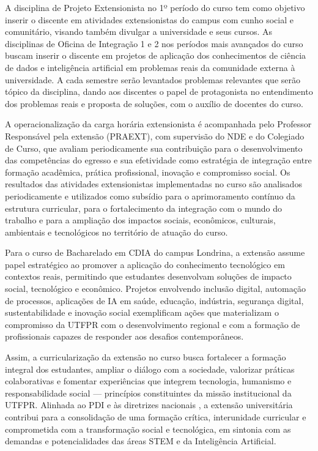 A disciplina de Projeto Extensionista no 1º período do curso tem como objetivo inserir o discente em atividades extensionistas do campus com cunho social e comunitário, visando também divulgar a universidade e seus cursos. As disciplinas de Oficina de Integração 1 e 2 nos períodos mais avançados do curso buscam inserir o discente em projetos de aplicação dos conhecimentos de ciência de dados e inteligência artificial em problemas reais da comunidade externa à universidade. A cada semestre serão levantados problemas relevantes que serão tópico da disciplina, dando aos discentes o papel de protagonista no entendimento dos problemas reais e proposta de soluções, com o auxílio de docentes do curso.

A operacionalização da carga horária extensionista é acompanhada pelo Professor Responsável pela extensão (PRAEXT), com supervisão do NDE e do Colegiado de Curso, que avaliam periodicamente sua contribuição para o desenvolvimento das competências do egresso e sua efetividade como estratégia de integração entre formação acadêmica, prática profissional, inovação e compromisso social. Os resultados das atividades extensionistas implementadas no curso são analisados periodicamente e utilizados como subsídio para o aprimoramento contínuo da estrutura curricular, para o fortalecimento da integração com o mundo do trabalho e para a ampliação dos impactos sociais, econômicos, culturais, ambientais e tecnológicos no território de atuação do curso.

Para o curso de Bacharelado em CDIA do campus Londrina, a extensão assume papel estratégico ao promover a aplicação do conhecimento tecnológico em contextos reais, permitindo que estudantes desenvolvam soluções de impacto social, tecnológico e econômico. Projetos envolvendo inclusão digital, automação de processos, aplicações de IA em saúde, educação, indústria, segurança digital, sustentabilidade e inovação social exemplificam ações que materializam o compromisso da UTFPR com o desenvolvimento regional e com a formação de profissionais capazes de responder aos desafios contemporâneos.

Assim, a curricularização da extensão no curso busca fortalecer a formação integral dos estudantes, ampliar o diálogo com a sociedade, valorizar práticas colaborativas e fomentar experiências que integrem tecnologia, humanismo e responsabilidade social — princípios constituintes da missão institucional da UTFPR. Alinhada ao PDI \cite{UTFPR_PDI_2017, UTFPR_PDI_2023} e às diretrizes nacionais \cite{DCN_2011, MEC_2016}, a extensão universitária contribui para a consolidação de uma formação crítica, interunidade curricular e comprometida com a transformação social e tecnológica, em sintonia com as demandas e potencialidades das áreas STEM e da Inteligência Artificial.

